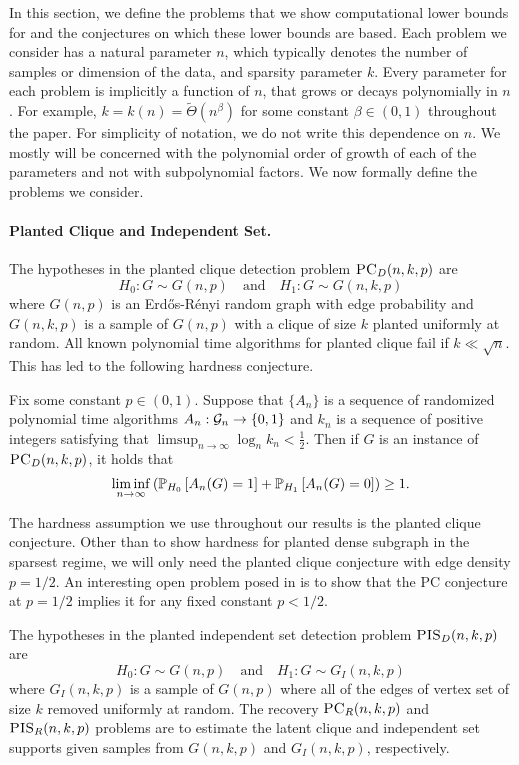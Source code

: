 In this section, we define the problems that we show computational lower bounds for and the conjectures on which these lower bounds are based. Each problem we consider has a natural parameter $n$, which typically denotes the number of samples or dimension of the data, and sparsity parameter $k$. Every parameter for each problem is implicitly a function of $n$, that grows or decays polynomially in $n$. For example, $k = k(n) = \tilde{\Theta}(n^{\beta})$ for some constant $\beta \in (0, 1)$ throughout the paper. For simplicity of notation, we do not write this dependence on $n$. We mostly will be concerned with the polynomial order of growth of each of the parameters and not with subpolynomial factors. We now formally define the problems we consider.

\paragraph{Planted Clique and Independent Set.} The hypotheses in the planted clique detection problem $\textsc{PC}_D(n, k, p)$ are
$$H_0: G \sim G(n, p) \quad \text{and} \quad H_1 : G \sim G(n, k, p)$$
where $G(n, p)$ is an Erd\H{o}s-R\'{e}nyi random graph with edge probability and $G(n, k, p)$ is a sample of $G(n, p)$ with a clique of size $k$ planted uniformly at random. All known polynomial time algorithms for planted clique fail if $k \ll \sqrt{n}$. This has led to the following hardness conjecture.

\begin{conjecture}[PC Conjecture]
Fix some constant $p \in (0, 1)$. Suppose that $\{ A_n \}$ is a sequence of randomized polynomial time algorithms $A_n : \mathcal{G}_n \to \{0, 1\}$ and $k_n$ is a sequence of positive integers satisfying that $\limsup_{n \to \infty} \log_n k_n < \frac{1}{2}$. Then if $G$ is an instance of $\textsc{PC}_D(n, k, p)$, it holds that
$$\liminf_{n \to \infty} \left( \mathbb{P}_{H_0}\left[A_n(G) = 1\right] + \mathbb{P}_{H_1}\left[A_n(G) = 0\right] \right) \ge 1.$$ 
\end{conjecture}

The hardness assumption we use throughout our results is the planted clique conjecture. Other than to show hardness for planted dense subgraph in the sparsest regime, we will only need the planted clique conjecture with edge density $p = 1/2$. An interesting open problem posed in \cite{hajek2015computational} is to show that the PC conjecture at $p = 1/2$ implies it for any fixed constant $p < 1/2$.

The hypotheses in the planted independent set detection problem $\textsc{PIS}_D(n, k, p)$ are
$$H_0: G \sim G(n, p) \quad \text{and} \quad H_1 : G \sim G_I(n, k, p)$$
where $G_I(n, k, p)$ is a sample of $G(n, p)$ where all of the edges of vertex set of size $k$ removed uniformly at random. The recovery $\textsc{PC}_R(n, k, p)$ and $\textsc{PIS}_R(n, k, p)$ problems are to estimate the latent clique and independent set supports given samples from $G(n, k, p)$ and $G_I(n, k, p)$, respectively.

